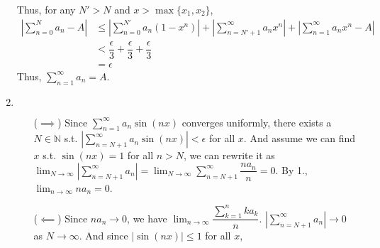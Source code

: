 \documentclass[12pt]{article}
\begin{document}
\begin{enumerate}
    Thus, for any $N' > N$ and $x > \max\{ x_1, x_2\}$,
    \begin{align*}
        |\sum_{n=0}^{N} a_n - A| &\leq |\sum_{n=0}^{N'} a_n(1-x^n)| + |\sum_{n=N'+1}^{\infty} a_n x^n | + |\sum_{n=1}^{\infty} a_nx^n - A|\\
        &< \dfrac{\epsilon}{3} + \dfrac{\epsilon}{3} + \dfrac{\epsilon}{3}\\
        &= \epsilon
    \end{align*}
    Thus, $\displaystyle\sum_{n=1}^{\infty} a_n = A$.

    \item $\ $\begin{enumerate}
        \item[($\implies$)] Since $\displaystyle\sum_{n=1}^{\infty} a_n \sin(nx)$ converges uniformly, 
        there exists a $N \in \mathbb{N}$ s.t. $|\displaystyle\sum_{n=N+1}^{\infty} a_n \sin(nx)| < \epsilon$ for all $x$.
        And assume we can find $x$ s.t. $\sin(nx) = 1$ for all $n>N$, 
        we can rewrite it as 
        $\displaystyle\lim_{N\to\infty}|\displaystyle\sum_{n=N+1}^{\infty} a_n| = \displaystyle\lim_{N\to\infty} \displaystyle\sum_{n=N+1}^{\infty} \dfrac{na_n}{n} = 0$.
        By 1., $\displaystyle\lim_{n\to\infty} na_n = 0$.

        \item[($\impliedby$)] Since $na_n \to 0$, we have         
        $\displaystyle\lim_{n\to\infty} \dfrac{\displaystyle\sum_{k=1}^{n} ka_k}{n}$.
        $\left|\displaystyle\sum_{n=N+1}^{\infty} a_n\right|\to 0$ as $N\to\infty$.
        And since $|\sin(nx)| \leq 1$ for all $x$,
        
    \end{enumerate}
\end{enumerate}
\end{document}
